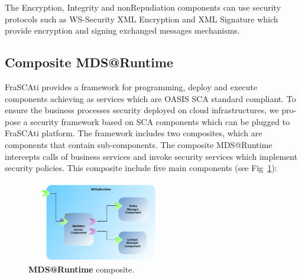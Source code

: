 \documentclass[runningheads,a4paper]{llncs}
\begin{document}
The Encryption, Integrity and nonRepudiation components can use security protocols such as WS-Security XML Encryption and XML Signature which provide encryption and signing  exchanged messages mechanisms.



\subsection{Composite MDS@Runtime}



FraSCAti provides a framework for programming, deploy and execute components achieving as services which are OASIS SCA standard compliant. To ensure the business processes security deployed on cloud infrastructures, we pro- pose a security framework based on SCA components which can be plugged to FraSCAti platform. The framework includes two composites, which are components that contain sub-components. The composite MDS@Runtime intercepts calls of business services and invoke security services which implement security policies. This composite include five main components (see Fig~\ref{fig:mdsAtRuntime}):

\begin{figure}[ht]  
\centering
\includegraphics[height=100pt, width=180pt]{mdsAtRuntimeComponent.png}
\caption{\textbf{MDS@Runtime} composite.}
\label{fig:mdsAtRuntime}
\end{figure}
\end{document}

